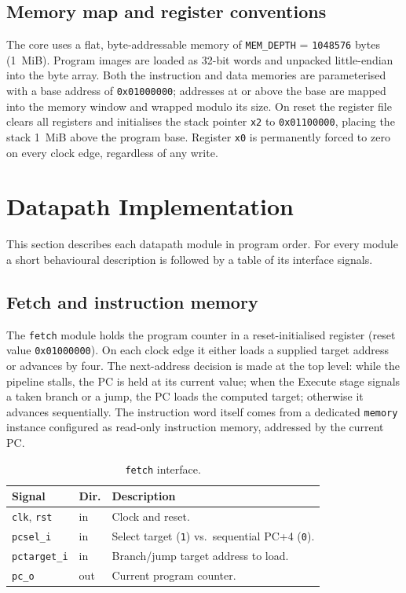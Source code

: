 \documentclass[11pt,a4paper]{article}
\newcommand{\code}[1]{\texttt{#1}}          %
\newcommand{\sig}[1]{\texttt{#1}}
\newcommand{\hex}[1]{\texttt{0x#1}}
\begin{document}
\subsection{Memory map and register conventions}
The core uses a flat, byte-addressable memory of \code{MEM\_DEPTH} = \code{1048576} bytes
(1~MiB). Program images are loaded as 32-bit words and unpacked little-endian into the
byte array. Both the instruction and data memories are parameterised with a base address
of \hex{01000000}; addresses at or above the base are mapped into the memory window and
wrapped modulo its size. On reset the register file clears all registers and initialises
the stack pointer \sig{x2} to \hex{01100000}, placing the stack 1~MiB above the program
base. Register \sig{x0} is permanently forced to zero on every clock edge, regardless of
any write.

\section{Datapath Implementation}
\label{sec:datapath}
This section describes each datapath module in program order. For every module a short
behavioural description is followed by a table of its interface signals.

\subsection{Fetch and instruction memory}
The \code{fetch} module holds the program counter in a reset-initialised register (reset
value \hex{01000000}). On each clock edge it either loads a supplied target address or
advances by four. The next-address decision is made at the top level: while the pipeline
stalls, the PC is held at its current value; when the Execute stage signals a taken branch
or a jump, the PC loads the computed target; otherwise it advances sequentially. The
instruction word itself comes from a dedicated \code{memory} instance configured as
read-only instruction memory, addressed by the current PC.

\begin{table}[h]
\centering
\caption{\code{fetch} interface.}
\label{tab:fetch}
\small
\begin{tabular}{@{}l l l@{}}
\toprule
\textbf{Signal} & \textbf{Dir.} & \textbf{Description} \\
\midrule
\sig{clk}, \sig{rst}     & in  & Clock and reset. \\
\sig{pcsel\_i}           & in  & Select target (\sig{1}) vs.\ sequential PC+4 (\sig{0}). \\
\sig{pctarget\_i}        & in  & Branch/jump target address to load. \\
\sig{pc\_o}              & out & Current program counter. \\
\bottomrule
\end{tabular}
\end{table}
\end{document}
